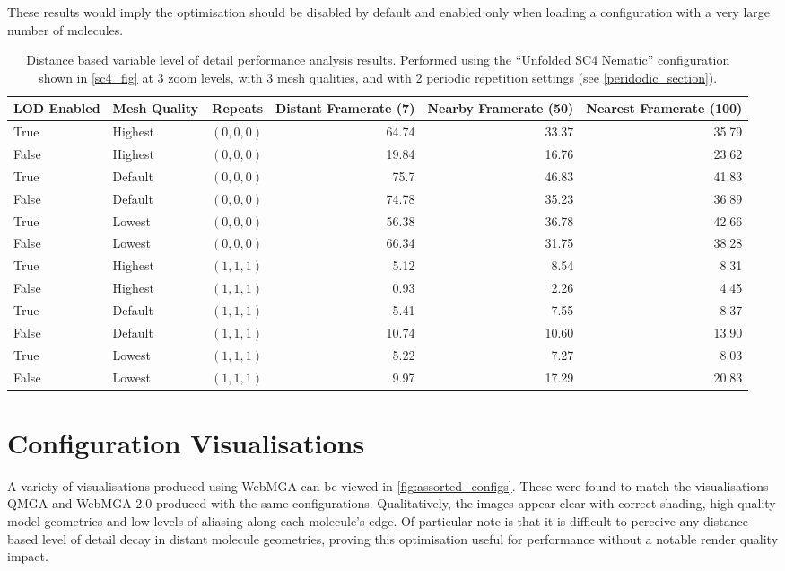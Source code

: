 These results would imply the optimisation should be disabled by default and enabled only when loading a configuration with a very large number of molecules.
\begin{table}
  \begin{center}
  \begin{adjustbox}{width=\textwidth}
    \begin{tabular}{llrrrr}
    \hline
    \hline
    LOD Enabled & Mesh Quality & Repeats & Distant Framerate (7) & Nearby Framerate (50) & Nearest Framerate (100)\\
    \hline
    True & Highest & $(0,0,0)$ & 64.74 &  33.37 & 35.79 \\
    False & Highest & $(0,0,0)$ & 19.84 & 16.76 & 23.62 \\
    
    True & Default & $(0,0,0)$ & 75.7 & 46.83 & 41.83 \\
    False & Default & $(0,0,0)$ & 74.78 & 35.23 & 36.89 \\
    
    True & Lowest & $(0,0,0)$ & 56.38 & 36.78 & 42.66\\
    False & Lowest & $(0,0,0)$ & 66.34 & 31.75 & 38.28\\
    \hline
    True & Highest & $(1,1,1)$ & 5.12 & 8.54 & 8.31 \\
    False & Highest & $(1,1,1)$ & 0.93 & 2.26 & 4.45 \\
    
    True & Default & $(1,1,1)$ & 5.41 & 7.55 & 8.37 \\
    False & Default & $(1,1,1)$ & 10.74 & 10.60 & 13.90 \\
    
    True & Lowest & $(1,1,1)$ & 5.22 & 7.27 & 8.03\\
    False & Lowest & $(1,1,1)$ & 9.97 & 17.29 & 20.83\\
    \hline
    \hline
    \end{tabular}
  \end{adjustbox}
  \end{center}
  \caption{Distance based variable level of detail performance analysis results. Performed using the ``Unfolded SC4 Nematic'' configuration shown in \cref{sc4_fig} at 3 zoom levels, with 3 mesh qualities, and with 2 periodic repetition settings (see \cref{peridodic_section}).}
  \label{tab:lod_test}
\end{table}

\section{Configuration Visualisations}
A variety of visualisations produced using WebMGA can be viewed in \cref{fig:assorted_configs}. These were found to match the visualisations QMGA and WebMGA 2.0 produced with the same configurations. Qualitatively, the images appear clear with correct shading, high quality model geometries and low levels of aliasing along each molecule's edge. Of particular note is that it is difficult to perceive any distance-based level of detail decay in distant molecule geometries, proving this optimisation useful for performance without a notable render quality impact.
